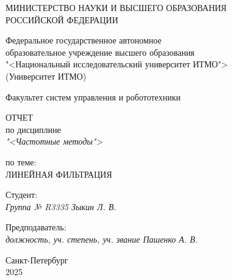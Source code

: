 \thispagestyle{empty}

\begin{center}
    МИНИСТЕРСТВО НАУКИ И ВЫСШЕГО ОБРАЗОВАНИЯ \\ РОССИЙСКОЙ ФЕДЕРАЦИИ

    \vspace{20pt}

    Федеральное государственное автономное \\ образовательное учреждение высшего образования \\
    "<Национальный исследовательский университет ИТМО"> \\
    (Университет ИТМО)

    \vspace{20pt}

    Факультет систем управления и робототехники
\end{center}

\vfill

\begin{center}
    ОТЧЕТ \\  
    по дисциплине \\
    \textit{"<Частотные методы">}

    \vspace{20pt}

    по теме: \\
    \uppercase{Линейная фильтрация}
\end{center}

\vfill

    \noindent Студент: \\
    \textit{Группа № R3335 \hfill Зыкин Л. В.}

    \vspace{20pt}

    \noindent Предподаватель: \\
    \textit{должность, уч. степень, уч. звание \hfill Пашенко А. В.}

\vfill

\begin{center}
    Санкт-Петербург \\ 2025
\end{center}